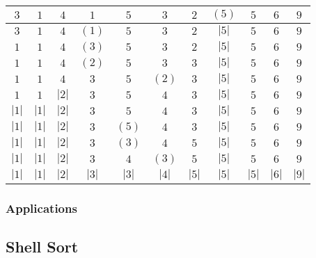 \documentclass{article}
\begin{document}
\begin{itemize}
\centering\begin{tabular}{|c|c|c|c|c|c|c|c|c|c|c|}
\hline
$3$ & $1$ & $4$ & $1$ & $5$ & $3$ & $2$ & $(5)$ & $5$ & $6$ & $9$\\
\hline
$3$ & $1$ & $4$ & $(1)$ & $5$ & $3$ & $2$ & $|5|$ & $5$ & $6$ &
$9$\\ \hline
$1$ & $1$ & $4$ & $(3)$ & $5$ & $3$ & $2$ & $|5|$ & $5$ & $6$ &
$9$\\ \hline
$1$ & $1$ & $4$ & $(2)$ & $5$ & $3$ & $3$ & $|5|$ & $5$ & $6$ &
$9$\\ \hline
$1$ & $1$ & $4$ & $3$ & $5$ & $(2)$ & $3$ & $|5|$ & $5$ & $6$ &
$9$\\ \hline
$1$ & $1$ & $|2|$ & $3$ & $5$ & $4$ & $3$ & $|5|$ & $5$ & $6$ &
$9$\\ \hline
$|1|$ & $|1|$ & $|2|$ & $3$ & $5$ & $4$ & $3$ & $|5|$ & $5$ & $6$ &
$9$\\ \hline
$|1|$ & $|1|$ & $|2|$ & $3$ & $(5)$ & $4$ & $3$ & $|5|$ & $5$ & $6$
& $9$\\ \hline
$|1|$ & $|1|$ & $|2|$ & $3$ & $(3)$ & $4$ & $5$ & $|5|$ & $5$ & $6$
& $9$\\ \hline
$|1|$ & $|1|$ & $|2|$ & $3$ & $4$ & $(3)$ & $5$ & $|5|$ & $5$ & $6$
& $9$\\ \hline
$|1|$ & $|1|$ & $|2|$ & $|3|$ & $|3|$ & $|4|$ & $|5|$ & $|5|$ &
$|5|$ &
$|6|$ & $|9|$\\ \hline
\end{tabular}
\end{itemize}
\subsubsection{Applications}
   \subsection{Shell Sort}
\end{document}
